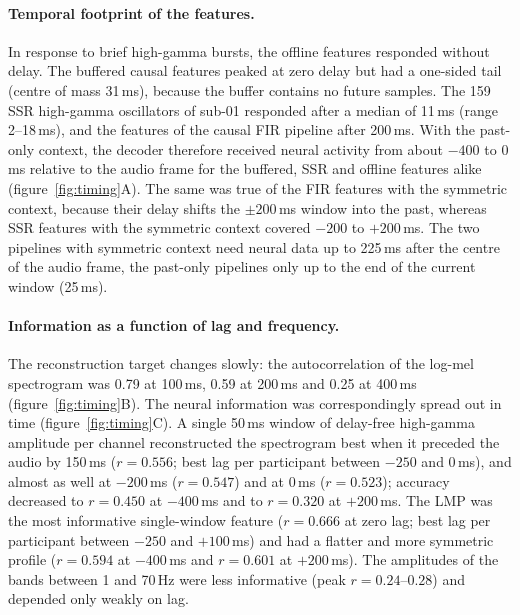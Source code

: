 \documentclass{iopjournal}
\begin{document}
\paragraph{Temporal footprint of the features.} In response to brief high-gamma bursts, the offline features responded without delay. The buffered causal features peaked at zero delay but had a one-sided tail (centre of mass 31\,ms), because the buffer contains no future samples. The 159 SSR high-gamma oscillators of sub-01 responded after a median of 11\,ms (range 2--18\,ms), and the features of the causal FIR pipeline after 200\,ms. With the past-only context, the decoder therefore received neural activity from about $-400$ to $0$\,ms relative to the audio frame for the buffered, SSR and offline features alike (figure~\ref{fig:timing}A). The same was true of the FIR features with the symmetric context, because their delay shifts the $\pm200$\,ms window into the past, whereas SSR features with the symmetric context covered $-200$ to $+200$\,ms. The two pipelines with symmetric context need neural data up to 225\,ms after the centre of the audio frame, the past-only pipelines only up to the end of the current window (25\,ms).

\paragraph{Information as a function of lag and frequency.} The reconstruction target changes slowly: the autocorrelation of the log-mel spectrogram was 0.79 at 100\,ms, 0.59 at 200\,ms and 0.25 at 400\,ms (figure~\ref{fig:timing}B). The neural information was correspondingly spread out in time (figure~\ref{fig:timing}C). A single 50\,ms window of delay-free high-gamma amplitude per channel reconstructed the spectrogram best when it preceded the audio by 150\,ms ($r=0.556$; best lag per participant between $-250$ and $0$\,ms), and almost as well at $-200$\,ms ($r=0.547$) and at $0$\,ms ($r=0.523$); accuracy decreased to $r=0.450$ at $-400$\,ms and to $r=0.320$ at $+200$\,ms. The LMP was the most informative single-window feature ($r=0.666$ at zero lag; best lag per participant between $-250$ and $+100$\,ms) and had a flatter and more symmetric profile ($r=0.594$ at $-400$\,ms and $r=0.601$ at $+200$\,ms). The amplitudes of the bands between 1 and 70\,Hz were less informative (peak $r=0.24$--$0.28$) and depended only weakly on lag.
\end{document}

